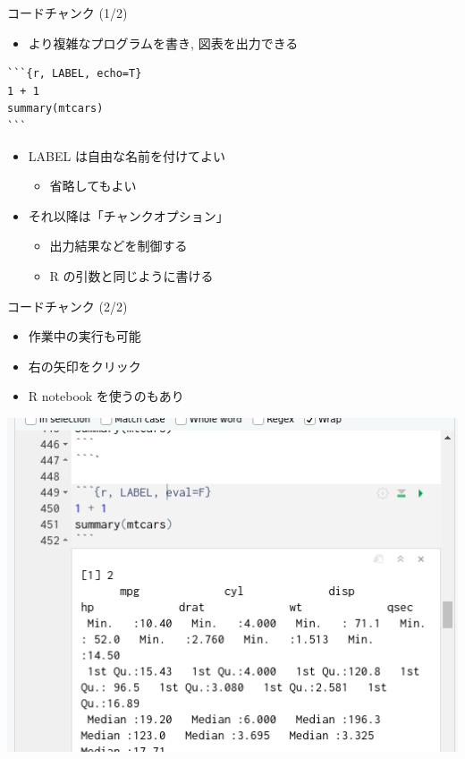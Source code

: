 \documentclass[
  ignorenonframetext,
]{beamer}
\providecommand{\tightlist}{%
  \setlength{\itemsep}{0pt}\setlength{\parskip}{0pt}}
\begin{document}
\begin{frame}[fragile]{コードチャンク (1/2)}
\protect\hypertarget{ux30b3ux30fcux30c9ux30c1ux30e3ux30f3ux30af-12}{}
\begin{itemize}
\tightlist
\item
  より複雑なプログラムを書き, 図表を出力できる
\end{itemize}

\begin{verbatim}
```{r, LABEL, echo=T}
1 + 1
summary(mtcars)
```
\end{verbatim}

\begin{itemize}
\tightlist
\item
  LABEL は自由な名前を付けてよい

  \begin{itemize}
  \tightlist
  \item
    省略してもよい
  \end{itemize}
\item
  それ以降は「チャンクオプション」

  \begin{itemize}
  \tightlist
  \item
    出力結果などを制御する
  \item
    R の引数と同じように書ける
  \end{itemize}
\end{itemize}
\end{frame}

\begin{frame}{コードチャンク (2/2)}
\protect\hypertarget{ux30b3ux30fcux30c9ux30c1ux30e3ux30f3ux30af-22}{}
\begin{itemize}
\tightlist
\item
  作業中の実行も可能
\item
  右の矢印をクリック
\item
  R notebook を使うのもあり
\end{itemize}

\begin{center}\includegraphics[width=1\linewidth,height=1\textheight,keepaspectratio]{img/knitr} \end{center}
\end{frame}
\end{document}
